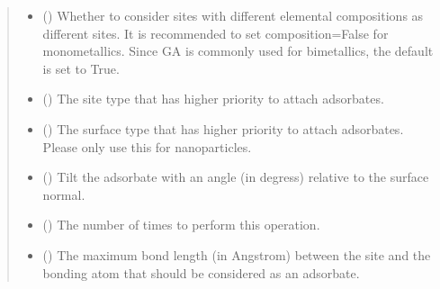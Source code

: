 \documentclass[letterpaper,10pt,english]{sphinxmanual}
\begin{document}
\begin{fulllineitems}
\begin{quote}
\begin{description}
\begin{itemize}
\item {} 
 (\sphinxstyleliteralemphasis{\sphinxupquote{, }}) \textendash{} Whether to consider sites with different elemental compositions as
different sites. It is recommended to set composition=False for
monometallics. Since GA is commonly used for bimetallics, the
default is set to True.

\item {} 
 (\sphinxstyleliteralemphasis{\sphinxupquote{, }}) \textendash{} The site type that has higher priority to attach adsorbates.

\item {} 
 (\sphinxstyleliteralemphasis{\sphinxupquote{, }}) \textendash{} The surface type that has higher priority to attach adsorbates.
Please only use this for nanoparticles.

\item {} 
 (\sphinxstyleliteralemphasis{\sphinxupquote{, }}) \textendash{} Tilt the adsorbate with an angle (in degress) relative to the
surface normal.

\item {} 
 (\sphinxstyleliteralemphasis{\sphinxupquote{, }}) \textendash{} The number of times to perform this operation.

\item {} 
 (\sphinxstyleliteralemphasis{\sphinxupquote{, }}) \textendash{} The maximum bond length (in Angstrom) between the site and the
bonding atom  that should be considered as an adsorbate.

\end{itemize}


\end{description}
\end{quote}
\end{fulllineitems}
\end{document}
